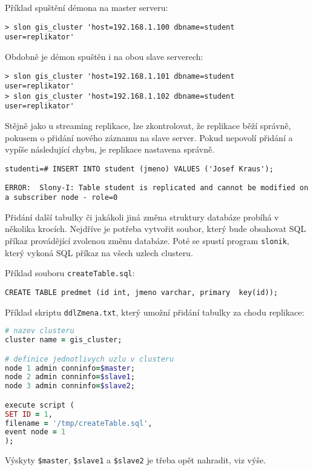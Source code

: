 Příklad spuštění démona na master serveru:
\begin{lstlisting}
> slon gis_cluster 'host=192.168.1.100 dbname=student  user=replikator'
\end{lstlisting}
Obdobně je démon spuštěn i na obou slave serverech:
\begin{lstlisting}
> slon gis_cluster 'host=192.168.1.101 dbname=student  user=replikator'
> slon gis_cluster 'host=192.168.1.102 dbname=student  user=replikator'
\end{lstlisting}

Stějně jako u streaming replikace, lze zkontrolovat, že replikace běží správně,
pokusem o přidání nového záznamu na slave server. Pokud nepovolí přidání a
vypíše následující chybu, je replikace nastavena správně.

\begin{lstlisting}
studenti=# INSERT INTO student (jmeno) VALUES ('Josef Kraus');
\end{lstlisting}
\begin{lstlisting}[identifierstyle=\color{black},stringstyle=\color{black},keywordstyle=\color{black}]
ERROR:  Slony-I: Table student is replicated and cannot be modified on a subscriber node - role=0
\end{lstlisting}

Přidání další tabulky či jakákoli jiná změna struktury databáze probíhá v
několika krocích. Nejdříve je potřeba vytvořit soubor, který bude obsahovat SQL
příkaz provádějící zvolenou změnu databáze. Poté se spustí program
\texttt{slonik}, který vykoná SQL příkaz na všech uzlech clusteru.

Příklad souboru \texttt{createTable.sql}:

\begin{lstlisting}
CREATE TABLE predmet (id int, jmeno varchar, primary  key(id));
\end{lstlisting}

Příklad skriptu \texttt{ddlZmena.txt}, který umožní přidání tabulky za chodu
replikace:

\begin{lstlisting}[language=ruby]
# nazev clusteru
cluster name = gis_cluster;

# definice jednotlivych uzlu v clusteru
node 1 admin conninfo=$master;
node 2 admin conninfo=$slave1;
node 3 admin conninfo=$slave2;

execute script (
SET ID = 1,
filename = '/tmp/createTable.sql',
event node = 1
);
\end{lstlisting}
Výskyty \texttt{\$master}, \texttt{\$slave1} a \texttt{\$slave2} je třeba opět
nahradit, viz výše.


